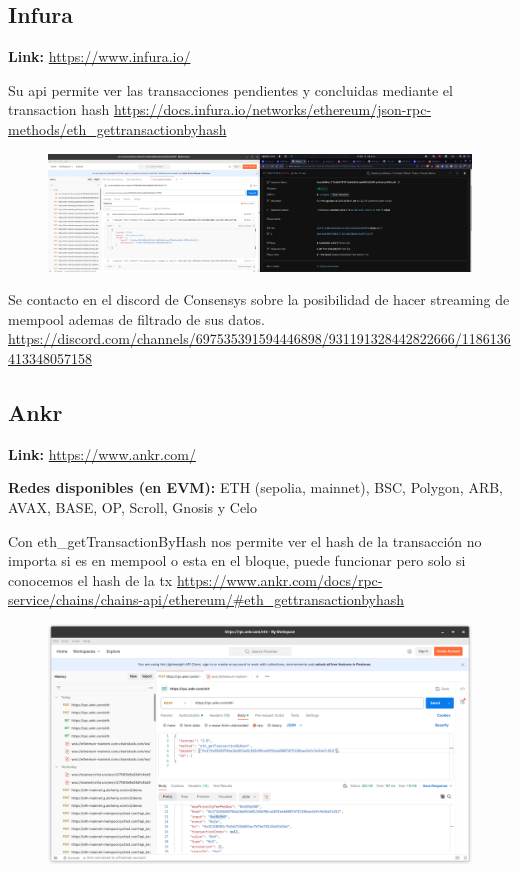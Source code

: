 \clearpage
\subsection{Infura}

\textbf{Link:} \url{https://www.infura.io/}

\medskip

Su api permite ver las transacciones pendientes y concluidas mediante el transaction hash \url{https://docs.infura.io/networks/ethereum/json-rpc-methods/eth_gettransactionbyhash}

\begin{figure}
    \centering
    \includegraphics[width=1\linewidth]{img//screenshots/Screenshot from 2023-12-15 23-59-44.png}
\end{figure}

Se contacto en el discord de Consensys sobre la posibilidad de hacer streaming de mempool ademas de filtrado de sus datos. \url{https://discord.com/channels/697535391594446898/931191328442822666/1186136413348057158}
\clearpage
\subsection{Ankr}

\textbf{Link:} \url{https://www.ankr.com/}

\textbf{Redes disponibles (en EVM):} ETH (sepolia, mainnet), BSC, Polygon, ARB, AVAX, BASE, OP, Scroll, Gnosis y  Celo

\medskip

Con eth\_getTransactionByHash nos permite ver el hash de la transacción no importa si es en mempool o esta en el bloque, puede funcionar pero solo si conocemos el hash de la tx \url{https://www.ankr.com/docs/rpc-service/chains/chains-api/ethereum/#eth_gettransactionbyhash}

\begin{figure}
    \centering
    \includegraphics[width=1\linewidth]{img//screenshots/Screenshot from 2023-12-16 00-45-50.png}
\end{figure}

